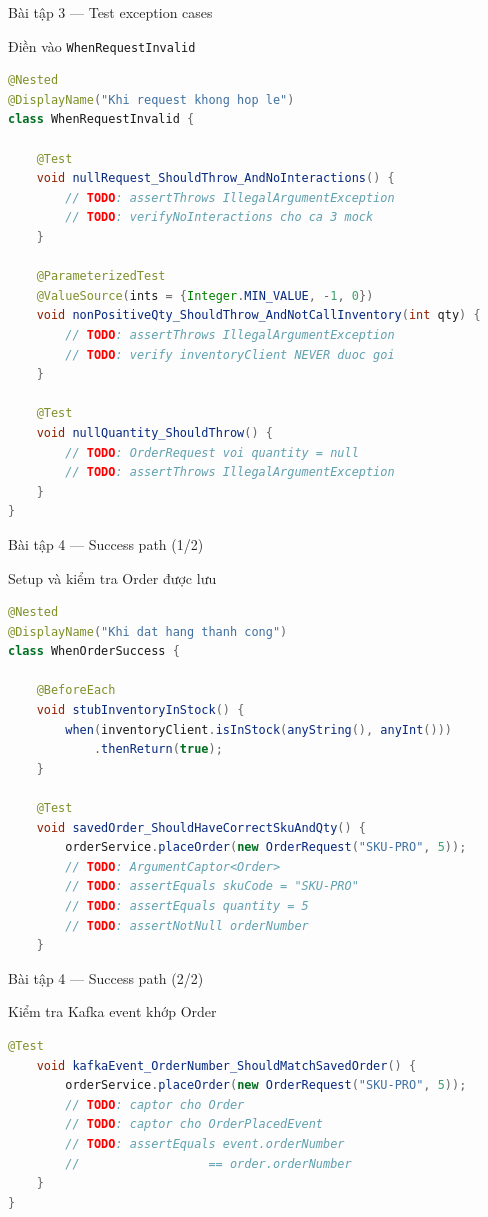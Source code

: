 \documentclass[aspectratio=169,10pt]{beamer}
\begin{document}
\begin{frame}[fragile,shrink=25]{Bài tập 3 --- Test exception cases}
  \begin{block}{Điền vào \texttt{WhenRequestInvalid}}
\begin{lstlisting}[language=java]
@Nested
@DisplayName("Khi request khong hop le")
class WhenRequestInvalid {

    @Test
    void nullRequest_ShouldThrow_AndNoInteractions() {
        // TODO: assertThrows IllegalArgumentException
        // TODO: verifyNoInteractions cho ca 3 mock
    }

    @ParameterizedTest
    @ValueSource(ints = {Integer.MIN_VALUE, -1, 0})
    void nonPositiveQty_ShouldThrow_AndNotCallInventory(int qty) {
        // TODO: assertThrows IllegalArgumentException
        // TODO: verify inventoryClient NEVER duoc goi
    }

    @Test
    void nullQuantity_ShouldThrow() {
        // TODO: OrderRequest voi quantity = null
        // TODO: assertThrows IllegalArgumentException
    }
}
\end{lstlisting}
  \end{block}
\end{frame}

\begin{frame}[fragile]{Bài tập 4 --- Success path (1/2)}
  \begin{block}{Setup và kiểm tra Order được lưu}
\begin{lstlisting}[language=java]
@Nested
@DisplayName("Khi dat hang thanh cong")
class WhenOrderSuccess {

    @BeforeEach
    void stubInventoryInStock() {
        when(inventoryClient.isInStock(anyString(), anyInt()))
            .thenReturn(true);
    }

    @Test
    void savedOrder_ShouldHaveCorrectSkuAndQty() {
        orderService.placeOrder(new OrderRequest("SKU-PRO", 5));
        // TODO: ArgumentCaptor<Order>
        // TODO: assertEquals skuCode = "SKU-PRO"
        // TODO: assertEquals quantity = 5
        // TODO: assertNotNull orderNumber
    }
\end{lstlisting}
  \end{block}
\end{frame}

\begin{frame}[fragile]{Bài tập 4 --- Success path (2/2)}
  \begin{block}{Kiểm tra Kafka event khớp Order}
\begin{lstlisting}[language=java]
    @Test
    void kafkaEvent_OrderNumber_ShouldMatchSavedOrder() {
        orderService.placeOrder(new OrderRequest("SKU-PRO", 5));
        // TODO: captor cho Order
        // TODO: captor cho OrderPlacedEvent
        // TODO: assertEquals event.orderNumber
        //                  == order.orderNumber
    }
}
\end{lstlisting}
  \end{block}
\end{frame}
\end{document}
